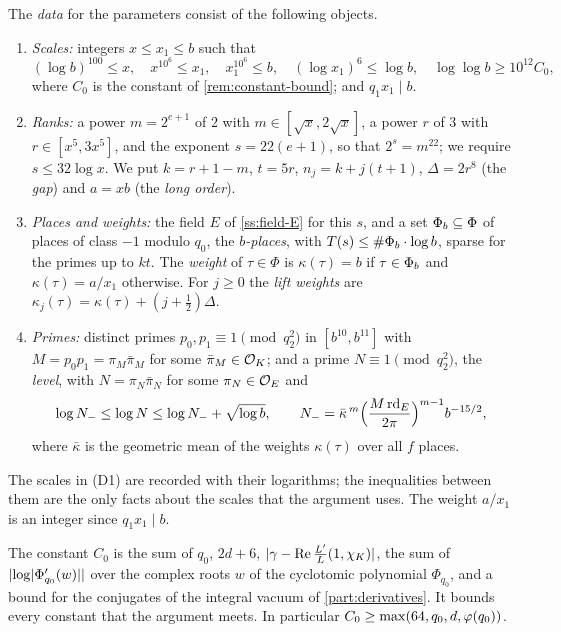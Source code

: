 \begin{definition}\label{def:data}
The \emph{data} for the parameters consist of the following objects.
\begin{enumerate}[label=\textup{(D\arabic*)}]
\item \emph{Scales:} integers $x\le x_1\le b$ such that
\[
  (\log b)^{100}\le x,\quad x^{10^6}\le x_1,\quad x_1^{10^6}\le b,\quad(\log x_1)^6\le\log b,\quad
  \log\log b\ge10^{12}C_0,
\]
where $C_0$ is the constant of \cref{rem:constant-bound}; and $q_1x_1\mid b$.
\item \emph{Ranks:} a power $m=2^{e+1}$ of $2$ with $m\in[\sqrt x,2\sqrt x]$, a power $r$ of $3$ with
$r\in[x^5,3x^5]$, and the exponent $s=22(e+1)$, so that $2^s=m^{22}$; we require $s\le32\log x$. We
put $k=r+1-m$, $t=5r$, $n_j=k+j(t+1)$, $\Delta=2r^8$ (the \emph{gap}) and $a=xb$ (the \emph{long
order}).
\item \emph{Places and weights:} the field $E$ of \cref{ss:field-E} for this $s$, and a set
$\Phi_b\subseteq\Phi$ of places of class $-1$ modulo $q_0$, the \emph{$b$-places}, with
$T(s)\le\#\Phi_b\cdot\log b$, sparse for the primes up to $kt$. The \emph{weight} of $\tau\in\Phi$ is
$\kappa(\tau)=b$ if $\tau\in\Phi_b$ and $\kappa(\tau)=a/x_1$ otherwise. For $j\ge0$ the \emph{lift
weights} are $\kappa_j(\tau)=\kappa(\tau)+(j+\tfrac12)\Delta$.
\item \emph{Primes:} distinct primes $p_0,p_1\equiv1\pmod{q_2^2}$ in $[b^{10},b^{11}]$ with
$M=p_0p_1=\pi_M\bar\pi_M$ for some $\bar\pi_M\in\mathcal{O}_K$; and a prime $N\equiv1\pmod{q_2^2}$, the
\emph{level}, with $N=\pi_N\bar\pi_N$ for some $\pi_N\in\mathcal{O}_E$ and
\[
  \log N_-\le\log N\le\log N_-+\sqrt{\log b},\qquad
  N_-=\bar\kappa^{\,m}\Bigl(\frac{M\,\mathrm{rd}_E}{2\pi}\Bigr)^{m-1}b^{-15/2},
\]
where $\bar\kappa$ is the geometric mean of the weights $\kappa(\tau)$ over all $f$ places.
\end{enumerate}
\end{definition}

The scales in (D1) are recorded with their logarithms; the inequalities between them are the only
facts about the scales that the argument uses. The weight $a/x_1$ is an integer since $q_1x_1\mid b$.

\begin{remark}\label{rem:constant-bound}
The constant $C_0$ is the sum of $q_0$, $2d+6$, $\lvert \gamma-\operatorname{Re}\frac{L'}{L}(1,\chi_K)\rvert$, the sum of
$\lvert \log\lvert \Phi_{q_0}'(w)\rvert\rvert$ over the complex roots $w$ of the cyclotomic polynomial
$\Phi_{q_0}$, and a bound for the conjugates of the integral vacuum of \cref{part:derivatives}. It bounds
every constant that the argument meets. In particular $C_0\ge\max(64,q_0,d,\varphi(q_0))$.
\end{remark}

